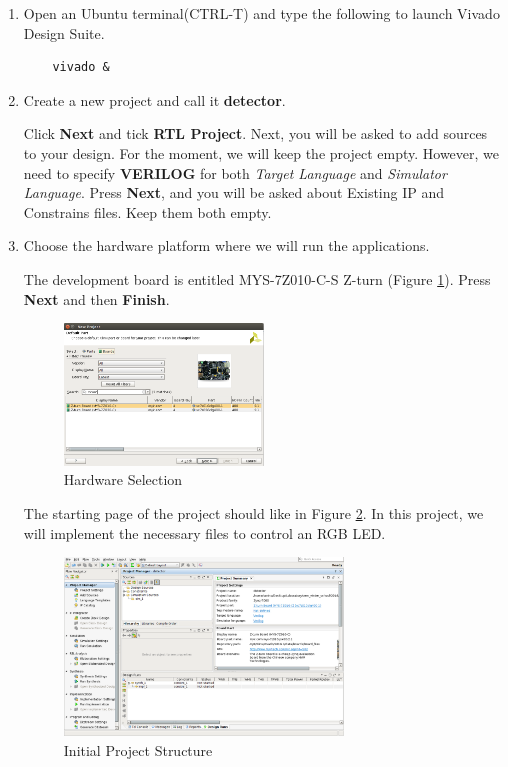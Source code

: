 \documentclass{article}
\begin{document}
\begin{enumerate}
\item Open an Ubuntu terminal(CTRL-T) and type the following to launch Vivado Design Suite.
    \begin{tcolorbox}
    \begin{verbatim}
    vivado &
    \end{verbatim}
    \end{tcolorbox}


\item Create a new project and call it \textbf{detector}.

Click \textbf{Next} and tick \textbf{RTL Project}. 
Next, you will be asked to add sources to your design. For the moment, we will keep the project empty. However, we need to specify \textbf{VERILOG} for both \textit{Target Language} and \textit{Simulator Language}. Press \textbf{Next}, and you will be asked about Existing IP and Constrains files. Keep them both empty.

\item Choose the hardware platform where we will run the applications. 

The development board is entitled MYS-7Z010-C-S Z-turn (Figure \ref{fig:board}).  Press \textbf{Next} and then \textbf{Finish}.  

\begin{figure}[h!]
    \centering
    \includegraphics[width=0.5\textwidth]{img/00_Board.png}
    \caption{Hardware Selection}
    \label{fig:board}
\end{figure}


The starting page of the project should like in Figure \ref{fig:first_page}. In this project, we will implement the necessary files to control an RGB LED.


\begin{figure}[h!]
    \centering
    \includegraphics[width=0.7\textwidth]{img/01_Project_Structure.png}
    \caption{Initial Project Structure}
    \label{fig:first_page}
\end{figure}

\end{enumerate}
\end{document}
